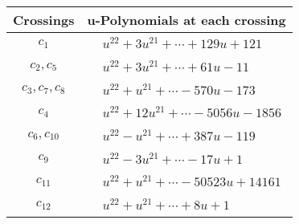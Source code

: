 \documentclass[1p]{elsarticle_modified}
\theoremstyle{definition}
\begin{document}
\begin{tabular}{m{50pt}|m{274pt}}
Crossings & \hspace{64pt}u-Polynomials at each crossing \\
\hline $$\begin{aligned}c_{1}\end{aligned}$$&$\begin{aligned}
&u^{22}+3 u^{21}+\cdots+129 u+121
\end{aligned}$\\
\hline $$\begin{aligned}c_{2},c_{5}\end{aligned}$$&$\begin{aligned}
&u^{22}+3 u^{21}+\cdots+61 u-11
\end{aligned}$\\
\hline $$\begin{aligned}c_{3},c_{7},c_{8}\end{aligned}$$&$\begin{aligned}
&u^{22}+u^{21}+\cdots-570 u-173
\end{aligned}$\\
\hline $$\begin{aligned}c_{4}\end{aligned}$$&$\begin{aligned}
&u^{22}+12 u^{21}+\cdots-5056 u-1856
\end{aligned}$\\
\hline $$\begin{aligned}c_{6},c_{10}\end{aligned}$$&$\begin{aligned}
&u^{22}- u^{21}+\cdots+387 u-119
\end{aligned}$\\
\hline $$\begin{aligned}c_{9}\end{aligned}$$&$\begin{aligned}
&u^{22}-3 u^{21}+\cdots-17 u+1
\end{aligned}$\\
\hline $$\begin{aligned}c_{11}\end{aligned}$$&$\begin{aligned}
&u^{22}+u^{21}+\cdots-50523 u+14161
\end{aligned}$\\
\hline $$\begin{aligned}c_{12}\end{aligned}$$&$\begin{aligned}
&u^{22}+u^{21}+\cdots+8 u+1
\end{aligned}$\\
\hline
\end{tabular}\\~\\
\end{document}
